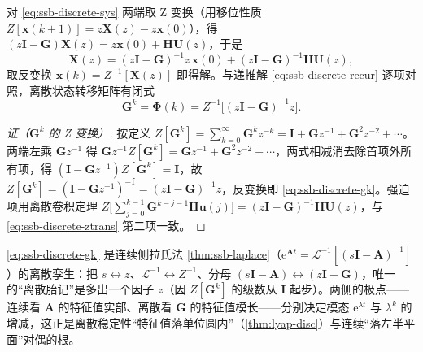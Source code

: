 \begin{theorem}[Z 变换解]\label{thm:ssb-discrete-ztrans}
对 \cref{eq:ssb-discrete-sys} 两端取 Z 变换（用移位性质 $Z[\mathbf{x}(k{+}1)]=z\mathbf{X}(z)-z\mathbf{x}(0)$），得 $(z\mathbf{I}-\mathbf{G})\mathbf{X}(z)=z\mathbf{x}(0)+\mathbf{H}\mathbf{U}(z)$，于是
\begin{equation}
  \mathbf{X}(z)=(z\mathbf{I}-\mathbf{G})^{-1}z\,\mathbf{x}(0)+(z\mathbf{I}-\mathbf{G})^{-1}\mathbf{H}\mathbf{U}(z),
  \label{eq:ssb-discrete-ztrans}
\end{equation}
取反变换 $\mathbf{x}(k)=Z^{-1}[\mathbf{X}(z)]$ 即得解。与递推解 \cref{eq:ssb-discrete-recur} 逐项对照，离散状态转移矩阵有闭式
\begin{equation}
  \mathbf{G}^k=\boldsymbol{\Phi}(k)=Z^{-1}\!\big[(z\mathbf{I}-\mathbf{G})^{-1}z\big].
  \label{eq:ssb-discrete-gk}
\end{equation}
\end{theorem}
\begin{proof}[证（$\mathbf{G}^k$ 的 Z 变换）]
按定义 $Z[\mathbf{G}^k]=\sum_{k=0}^{\infty}\mathbf{G}^k z^{-k}=\mathbf{I}+\mathbf{G}z^{-1}+\mathbf{G}^2z^{-2}+\cdots$。两端左乘 $\mathbf{G}z^{-1}$ 得 $\mathbf{G}z^{-1}Z[\mathbf{G}^k]=\mathbf{G}z^{-1}+\mathbf{G}^2z^{-2}+\cdots$，两式相减消去除首项外所有项，得 $(\mathbf{I}-\mathbf{G}z^{-1})Z[\mathbf{G}^k]=\mathbf{I}$，故 $Z[\mathbf{G}^k]=(\mathbf{I}-\mathbf{G}z^{-1})^{-1}=(z\mathbf{I}-\mathbf{G})^{-1}z$，反变换即 \cref{eq:ssb-discrete-gk}。强迫项用离散卷积定理 $Z\big[\sum_{j=0}^{k-1}\mathbf{G}^{k-j-1}\mathbf{H}\mathbf{u}(j)\big]=(z\mathbf{I}-\mathbf{G})^{-1}\mathbf{H}\mathbf{U}(z)$，与 \cref{eq:ssb-discrete-ztrans} 第二项一致。
\end{proof}

\begin{insight}
\cref{eq:ssb-discrete-gk} 是连续侧拉氏法 \cref{thm:ssb-laplace}（$\mathrm{e}^{\mathbf{A}t}=\mathcal{L}^{-1}[(s\mathbf{I}-\mathbf{A})^{-1}]$）的离散孪生：把 $s\!\leftrightarrow\!z$、$\mathcal{L}^{-1}\!\leftrightarrow\!Z^{-1}$、分母 $(s\mathbf{I}-\mathbf{A})\!\leftrightarrow\!(z\mathbf{I}-\mathbf{G})$，唯一的“离散胎记”是多出一个因子 $z$（因 $Z[\mathbf{G}^k]$ 的级数从 $\mathbf{I}$ 起步）。两侧的极点——连续看 $\mathbf{A}$ 的特征值实部、离散看 $\mathbf{G}$ 的特征值模长——分别决定模态 $\mathrm{e}^{\lambda t}$ 与 $\lambda^k$ 的增减，这正是离散稳定性“特征值落单位圆内”（\cref{thm:lyap-disc}）与连续“落左半平面”对偶的根。
\end{insight}

